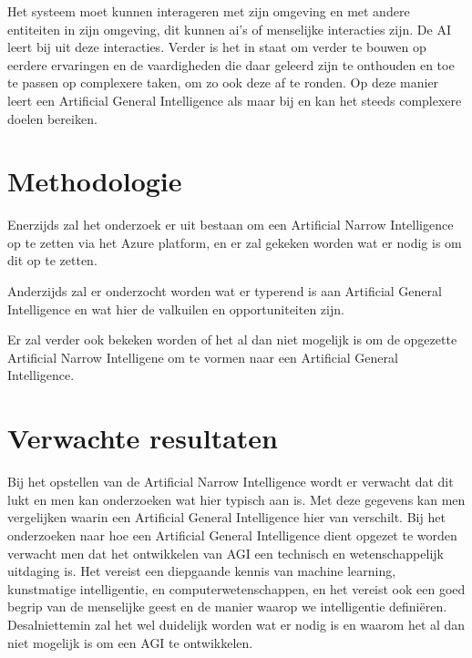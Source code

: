 Het systeem moet kunnen interageren met zijn omgeving en met andere entiteiten in zijn omgeving, dit kunnen ai's of menselijke interacties zijn. De AI leert bij uit deze interacties. Verder is het in staat om verder te bouwen op eerdere ervaringen en de vaardigheden die daar geleerd zijn te onthouden en toe te passen op complexere taken, om zo ook deze af te ronden. Op deze manier leert een Artificial General Intelligence als maar bij en kan het steeds complexere doelen bereiken.

\autocite{goertzel2007artificial}


\section{Methodologie}
\label{sec:methodologie}
Enerzijds zal het onderzoek er uit bestaan om een Artificial Narrow Intelligence op te zetten via het Azure platform, en er zal gekeken worden wat er nodig is om dit op te zetten.

Anderzijds zal er onderzocht worden wat er typerend is aan Artificial General Intelligence en wat hier de valkuilen en opportuniteiten zijn. 

Er zal verder ook bekeken worden of het al dan niet mogelijk is om de opgezette Artificial Narrow Intelligene om te vormen naar een Artificial General Intelligence. 

\section{Verwachte resultaten}
\label{sec:verwachte_resultaten}

Bij het opstellen van de Artificial Narrow Intelligence wordt er verwacht dat dit lukt en men kan onderzoeken wat hier \break typisch aan is. Met deze gegevens kan men vergelijken waarin een Artificial General Intelligence hier van verschilt. \linebreak Bij het onderzoeken naar hoe een Artificial General \break Intelligence dient opgezet te worden verwacht men dat het ontwikkelen van AGI een technisch en wetenschappelijk uitdaging is. Het vereist een diepgaande kennis van machine learning, kunstmatige intelligentie, en computerwetenschappen, en het vereist ook een goed begrip van de menselijke geest en de manier waarop we intelligentie definiëren. \linebreak Desalniettemin zal het wel duidelijk worden wat er nodig is en waarom het al dan niet mogelijk is om een AGI te ontwikkelen.
\newpage

